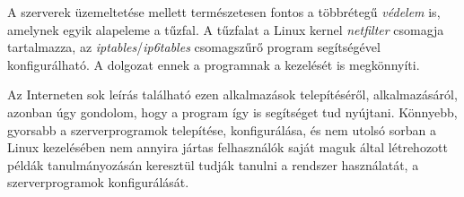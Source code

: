 \medskip
A szerverek üzemeltetése mellett természetesen fontos a többrétegű \textit{védelem} is, amelynek egyik alapeleme a tűzfal. A tűzfalat a Linux kernel \textit{netfilter} csomagja tartalmazza, az \textit{iptables}/\textit{ip6tables} csomagszűrő program segítségével konfigurálható. \cite{netfilter_iptables} A dolgozat ennek a programnak a kezelését is megkönnyíti.

\medskip
Az Interneten sok leírás található ezen alkalmazások telepítéséről, alkalmazásáról, azonban úgy gondolom, hogy a program így is segítséget tud nyújtani. Könnyebb, gyorsabb a szerverprogramok telepítése, konfigurálása, és nem utolsó sorban a Linux kezelésében nem annyira jártas felhasználók saját maguk által létrehozott példák tanulmányozásán keresztül tudják tanulni a rendszer használatát, a szerverprogramok konfigurálását.
